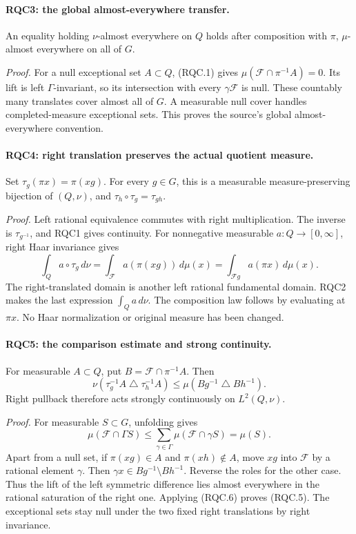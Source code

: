 \paragraph{RQC3: the global almost-everywhere transfer.}
\label{claim:RQC3}
An equality holding \(\nu\)-almost everywhere on \(Q\) holds after
composition with \(\pi\), \(\mu\)-almost everywhere on all of \(G\).

\emph{Proof.}
For a null exceptional set \(A\subset Q\), (RQC.1) gives
\(\mu(\mathcal F\cap\pi^{-1}A)=0\).
Its lift is left \(\Gamma\)-invariant, so its intersection with
every \(\gamma\mathcal F\) is null.  These countably many translates
cover almost all of \(G\).  A measurable null cover handles
completed-measure exceptional sets.  This proves the source's
global almost-everywhere convention.

\paragraph{RQC4: right translation preserves the actual quotient measure.}
\label{claim:RQC4}
Set \(\tau_g(\pi x)=\pi(xg)\).  For every \(g\in G\), this is a
measurable measure-preserving bijection of \((Q,\nu)\), and
\(\tau_h\circ\tau_g=\tau_{gh}\).

\emph{Proof.}
Left rational equivalence commutes with right multiplication.
The inverse is \(\tau_{g^{-1}}\), and RQC1 gives continuity.
For nonnegative measurable \(a:Q\to[0,\infty]\), right Haar
invariance gives
\[
 \int_Q a\circ\tau_g\,d\nu
 =\int_{\mathcal F}a(\pi(xg))\,d\mu(x)
 =\int_{\mathcal Fg}a(\pi x)\,d\mu(x).
 \tag{RQC.4}
\]
The right-translated domain is another left rational fundamental
domain.  RQC2 makes the last expression \(\int_Q a\,d\nu\).
The composition law follows by evaluating at \(\pi x\).
No Haar normalization or original measure has been changed.

\paragraph{RQC5: the comparison estimate and strong continuity.}
\label{claim:RQC5}
For measurable \(A\subset Q\), put \(B=\mathcal F\cap\pi^{-1}A\).
Then
\[
 \nu(\tau_g^{-1}A\mathbin{\triangle}\tau_h^{-1}A)
 \le\mu(Bg^{-1}\mathbin{\triangle}Bh^{-1}).
 \tag{RQC.5}
\]
Right pullback therefore acts strongly continuously on \(L^2(Q,\nu)\).

\emph{Proof.}
For measurable \(S\subset G\), unfolding gives
\[
 \mu(\mathcal F\cap\Gamma S)
 \le\sum_{\gamma\in\Gamma}\mu(\mathcal F\cap\gamma S)
 =\mu(S).
 \tag{RQC.6}
\]
Apart from a null set, if \(\pi(xg)\in A\) and
\(\pi(xh)\notin A\), move \(xg\) into \(\mathcal F\) by a
rational element \(\gamma\).  Then
\(\gamma x\in Bg^{-1}\setminus Bh^{-1}\).  Reverse the roles for
the other case.  Thus the lift of the left symmetric difference
lies almost everywhere in the rational saturation of the right
one.  Applying (RQC.6) proves (RQC.5).  The exceptional sets stay
null under the two fixed right translations by right invariance.


